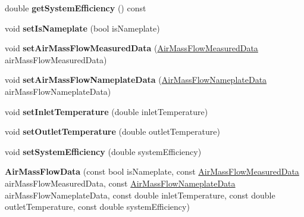 \begin{DoxyCompactItemize}
\mbox{\label{class_air_mass_flow_data_ad01e82b308d2153eaef3818430c18c6a}} 
double {\bfseries get\+System\+Efficiency} () const
\item 
\mbox{\label{class_air_mass_flow_data_a8093e119b1bf0c0dc082574660b56ab3}} 
void {\bfseries set\+Is\+Nameplate} (bool is\+Nameplate)
\item 
\mbox{\label{class_air_mass_flow_data_af4d68a24b3f250549a0b33bda04b0cf4}} 
void {\bfseries set\+Air\+Mass\+Flow\+Measured\+Data} (\hyperlink{class_air_mass_flow_measured_data}{Air\+Mass\+Flow\+Measured\+Data} air\+Mass\+Flow\+Measured\+Data)
\item 
\mbox{\label{class_air_mass_flow_data_adad30e62e8d6536620ad6c57ae1fd28d}} 
void {\bfseries set\+Air\+Mass\+Flow\+Nameplate\+Data} (\hyperlink{class_air_mass_flow_nameplate_data}{Air\+Mass\+Flow\+Nameplate\+Data} air\+Mass\+Flow\+Nameplate\+Data)
\item 
\mbox{\label{class_air_mass_flow_data_acb11c2d502c8b08615f828202fea881c}} 
void {\bfseries set\+Inlet\+Temperature} (double inlet\+Temperature)
\item 
\mbox{\label{class_air_mass_flow_data_a76eabf5b08a0cf32747cb80de0f7e8a0}} 
void {\bfseries set\+Outlet\+Temperature} (double outlet\+Temperature)
\item 
\mbox{\label{class_air_mass_flow_data_ae8f2a45f436a28301373c50e80826796}} 
void {\bfseries set\+System\+Efficiency} (double system\+Efficiency)
\item 
\mbox{\label{class_air_mass_flow_data_a62c2e215cc662a436402d05e4f6b55b6}} 
{\bfseries Air\+Mass\+Flow\+Data} (const bool is\+Nameplate, const \hyperlink{class_air_mass_flow_measured_data}{Air\+Mass\+Flow\+Measured\+Data} air\+Mass\+Flow\+Measured\+Data, const \hyperlink{class_air_mass_flow_nameplate_data}{Air\+Mass\+Flow\+Nameplate\+Data} air\+Mass\+Flow\+Nameplate\+Data, const double inlet\+Temperature, const double outlet\+Temperature, const double system\+Efficiency)
\item 

\end{DoxyCompactItemize}
